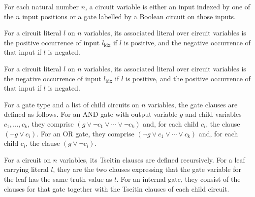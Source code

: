 \begin{definition}
\label{BoolCircuit.CktVar}
\leanok
{}
For each natural number $n$, a circuit variable is either an input indexed by one of the
$n$ input positions or a gate labelled by a Boolean circuit on those inputs.
\end{definition}

\begin{definition}
\label{BoolCircuit.Lit.toCktLiteral}
\leanok
{}
For a circuit literal $l$ on $n$ variables, its associated literal over circuit
variables is the positive occurrence of input $l_{\mathrm{idx}}$ if $l$ is positive, and
the negative occurrence of that input if $l$ is negated.
\end{definition}

\begin{definition}
\label{BoolCircuit.Lit.toCktLiteralNeg}
\leanok
{}
For a circuit literal $l$ on $n$ variables, its associated literal over circuit
variables is the negative occurrence of input $l_{\mathrm{idx}}$ if $l$ is positive, and
the positive occurrence of that input if $l$ is negated.
\end{definition}

\begin{definition}
\label{BoolCircuit.gateClauses}
\leanok
{}
For a gate type and a list of child circuits on $n$ variables, the gate clauses are
defined as follows. For an AND gate with output variable $g$ and child variables
$c_1,\ldots,c_k$, they comprise $(g\lor\neg c_1\lor\cdots\lor\neg c_k)$ and, for each
child $c_i$, the clause $(\neg g\lor c_i)$. For an OR gate, they comprise $(\neg g\lor
c_1\lor\cdots\lor c_k)$ and, for each child $c_i$, the clause $(g\lor\neg c_i)$.
\end{definition}

\begin{definition}
\label{BoolCircuit.TreeCircuit.tseitin}
\leanok
{}
For a circuit on $n$ variables, its Tseitin clauses are defined recursively. For a leaf
carrying literal $l$, they are the two clauses expressing that the gate variable for the
leaf has the same truth value as $l$. For an internal gate, they consist of the clauses
for that gate together with the Tseitin clauses of each child circuit.
\end{definition}

